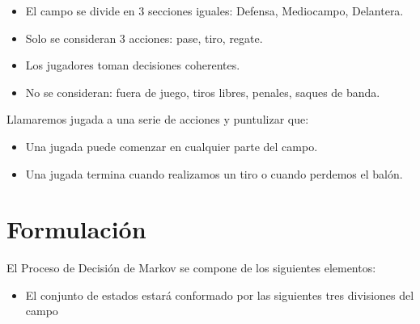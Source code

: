 \documentclass[
  us-letterpaper,
  DIV=11,
  numbers=noendperiod]{scrreprt}
\providecommand{\tightlist}{%
  \setlength{\itemsep}{0pt}\setlength{\parskip}{0pt}}\usepackage{longtable,booktabs,array}
\begin{document}
\begin{itemize}
\tightlist
\item
  El campo se divide en 3 secciones iguales: Defensa, Mediocampo,
  Delantera.
\item
  Solo se consideran 3 acciones: pase, tiro, regate.
\item
  Los jugadores toman decisiones coherentes.
\item
  No se consideran: fuera de juego, tiros libres, penales, saques de
  banda.
\end{itemize}

Llamaremos jugada a una serie de acciones y puntulizar que:

\begin{itemize}
\tightlist
\item
  Una jugada puede comenzar en cualquier parte del campo.
\item
  Una jugada termina cuando realizamos un tiro o cuando perdemos el
  balón.
\end{itemize}


\chapter{Formulación}\label{formulaciuxf3n}

El Proceso de Decisión de Markov se compone de los siguientes elementos:

\begin{itemize}
\tightlist
\item
  El conjunto de estados estará conformado por las siguientes tres
  divisiones del campo
\end{itemize}
\end{document}
